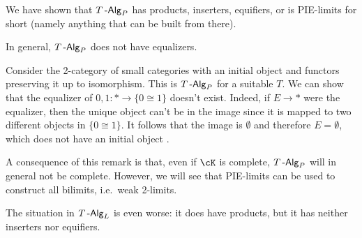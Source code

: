 \documentclass[a4paper,11pt,oneside,openany]{scrbook}
\begin{document}
We have shown that $T\operatorname{-\mathsf{Alg}}_P$ has products, inserters, equifiers, or is
PIE-limits for short (namely anything that can be built from there).

\begin{rmk}
    In general, $T\operatorname{-\mathsf{Alg}}_P$ does not have equalizers.
\end{rmk}

\begin{exmp}
    Consider the 2-category of small categories with an initial object and
    functors preserving it up to isomorphism. This is $T\operatorname{-\mathsf{Alg}}_P$ for a suitable
    $T$. We can show that the equalizer of $0,1\colon *\rightarrow\{0\cong 1\}$
    doesn't exist. Indeed, if $E\rightarrow *$ were the equalizer, then the
    unique object can't be in the image since it is mapped to two different
    objects in $\{0\cong 1\}$. It follows that the image is $\emptyset$ and
    therefore $E=\emptyset$, which does not have an initial object
    .
\end{exmp}

A consequence of this remark is that, even if $\cK$ is complete, $T\operatorname{-\mathsf{Alg}}_P$ will
in general not be complete. However, we will see that PIE-limits can be used to
construct all bilimits, i.e.\ weak 2-limits.

\begin{rmk}
    The situation in $T\operatorname{-\mathsf{Alg}}_L$ is even worse: it does have products, but it has
    neither inserters nor equifiers.
\end{rmk}
\end{document}
